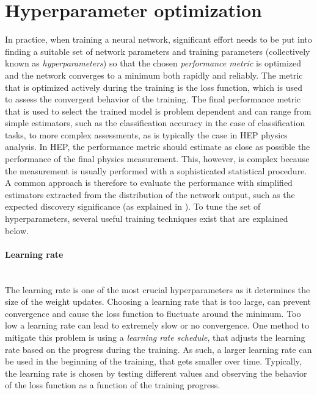 \section{Hyperparameter optimization} 
In practice, when training a neural network, significant effort needs to be put into finding a suitable set of network parameters and training parameters (collectively known as \emph{hyperparameters}) so that the chosen \emph{performance metric} is optimized and the network converges to a minimum both rapidly and reliably. 
The metric that is optimized actively during the training is the loss function, which is used to assess the convergent behavior of the training. 
The final performance metric that is used to select the trained model is problem dependent and can range from simple estimators, such as the classification accuracy in the case of classification tasks, to more complex assessments, as is typically the case in HEP physics analysis.
In HEP, the performance metric should estimate as close as possible the performance of the final physics measurement. This, however, is complex because the measurement is usually performed with a sophisticated statistical procedure. 
A common approach is therefore to evaluate the performance with simplified estimators extracted from the distribution of the network output, such as the expected discovery significance (as explained in ).
To tune the set of hyperparameters, several useful training techniques exist that are explained below.

\paragraph{Learning rate} \mbox{}\\
The learning rate is one of the most crucial hyperparameters as it determines the size of the weight updates. Choosing a learning rate that is too large, can prevent convergence and cause the loss function to fluctuate around the minimum. Too low a learning rate can lead to extremely slow or no convergence. 
One method to mitigate this problem is using a \emph{learning rate schedule}, that adjusts the learning rate based on the progress during the training. As such, a larger learning rate can be used in the beginning of the training, that gets smaller over time.
Typically, the learning rate is chosen by testing different values and observing the behavior of the loss function as a function of the training progress.


